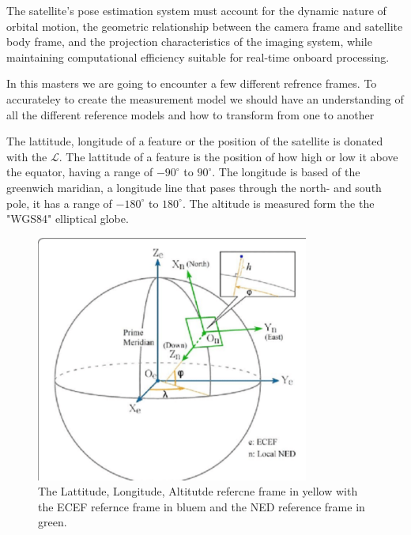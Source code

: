 The satellite's pose estimation system must account for the dynamic nature of orbital motion, 
the geometric relationship between the camera frame and satellite body frame, and the projection 
characteristics of the imaging system, while maintaining computational efficiency suitable for 
real-time onboard processing. 



In this masters we are going to encounter a few different refrence frames. To accurateley to create the measurement model we should have an understanding of all the different 
reference models and how to transform from one to another


The lattitude, longitude of a feature or the position of the satellite is donated with the $\mathcal{L}$. The lattitude of a feature is the position of how high or low it above the
equator, having a range of $-90^{\circ}$ to $90^{\circ}$. The longitude is based of the greenwich maridian, a longitude line that pases through the north- and south pole, it has a
range of $-180^{\circ}$ to $180^{\circ}$. The altitude is measured form the the "WGS84" elliptical globe.

\begin{figure}[htbp]
    \centering
    \includegraphics[width=0.8\textwidth]{figures/LLAReferenceframe.pdf}
    \caption{The Lattitude, Longitude, Altitutde refercne frame in yellow with the ECEF refernce frame in bluem and the NED reference
    frame in green.}
    \label{fig:lla_referenceframe}
\end{figure}

